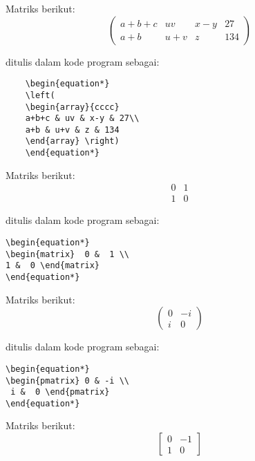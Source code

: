\noindent Matriks berikut:
\begin{equation*}
	\left(
	\begin{array}{cccc}
	a+b+c & uv & x-y & 27\\
	a+b & u+v & z & 134
	\end{array}\right)
\end{equation*}

\noindent ditulis dalam kode program sebagai:
\begin{verbatim}
	\begin{equation*}
	\left(
	\begin{array}{cccc}
	a+b+c & uv & x-y & 27\\
	a+b & u+v & z & 134
	\end{array} \right)
	\end{equation*}
\end{verbatim}

\noindent Matriks berikut:
\begin{equation*}
\begin{matrix}  0 &  1 \\ 
1 &  0 \end{matrix}
\end{equation*}

\noindent ditulis dalam kode program sebagai:
\begin{verbatim}
\begin{equation*}
\begin{matrix}  0 &  1 \\ 
1 &  0 \end{matrix}
\end{equation*}
\end{verbatim}

\noindent Matriks berikut:
\begin{equation*}
\begin{pmatrix} 0 & -i \\
 i &  0 \end{pmatrix}
\end{equation*}

\noindent ditulis dalam kode program sebagai:
\begin{verbatim}
\begin{equation*}
\begin{pmatrix} 0 & -i \\
 i &  0 \end{pmatrix}
\end{equation*}
\end{verbatim}

\noindent Matriks berikut:
\begin{equation*}
\begin{bmatrix} 0 & -1 \\ 
1 &  0 \end{bmatrix}
\end{equation*}

